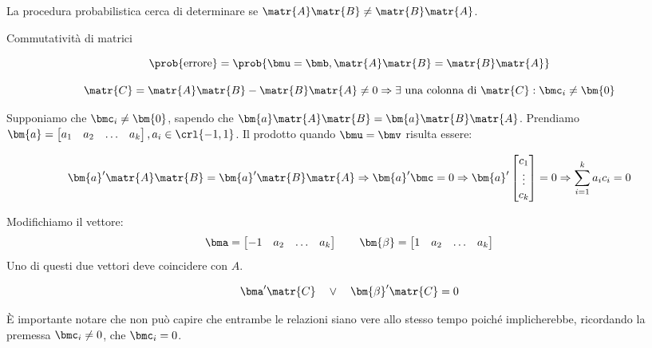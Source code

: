 \documentclass[\main/main.tex]{subfiles}
\begin{document}
La procedura probabilistica cerca di determinare se \(\matr{A}\matr{B} \neq \matr{B}\matr{A}\).


\IncMargin{1em}
\begin{algorithm}
	\BlankLine
	\caption{Commutatività di matrici}
\end{algorithm}\DecMargin{1em}

\[\prob{\text{errore}} = \prob{\bmu=\bmb, \matr{A}\matr{B} = \matr{B}\matr{A}}\]

\[
	\matr{C} = \matr{A}\matr{B} - \matr{B}\matr{A} \neq 0 \Rightarrow \exists \text{ una colonna di } \matr{C}: \bmc_i \neq \bm{0}
\]

Supponiamo che \(\bmc_i \neq \bm{0}\), sapendo che \(\bm{a}\matr{A}\matr{B} = \bm{a}\matr{B}\matr{A}\). Prendiamo \(\bm{a} = \begin{bmatrix}
	a_1 & a_2 & \ldots & a_k
\end{bmatrix}, a_i \in \crl{-1, 1}\). Il prodotto quando \(\bmu = \bmv \) risulta essere:

\[
	\bm{a}'\matr{A}\matr{B} = \bm{a}'\matr{B}\matr{A} \Rightarrow \bm{a}'\bmc = 0 \Rightarrow \bm{a}' \begin{bmatrix}
		c_1    \\
		\vdots \\
		c_k
	\end{bmatrix} = 0 \Rightarrow \sum_{i=1}^k a_i c_i = 0
\]

Modifichiamo il vettore:
\[
	\bma = \begin{bmatrix}
		-1 & a_2 & \ldots & a_k
	\end{bmatrix}
	\qquad
	\bm{\beta} = \begin{bmatrix}
		1 & a_2 & \ldots & a_k
	\end{bmatrix}
\]
Uno di questi due vettori deve coincidere con \(A\).

\[
	\bma' \matr{C} \quad \lor \quad \bm{\beta}'\matr{C} = 0
\]

È importante notare che non può capire che entrambe le relazioni siano vere allo stesso tempo poiché implicherebbe, ricordando la premessa \(\bmc_i \neq 0\), che \(\bmc_i = 0\).
\end{document}
